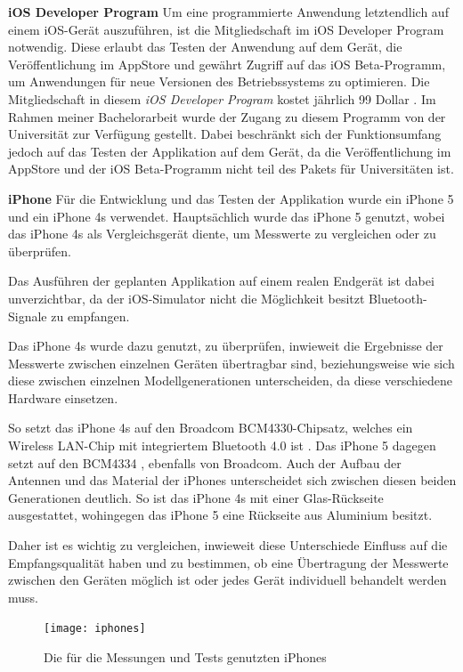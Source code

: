 \textbf{iOS Developer Program}
Um eine programmierte Anwendung letztendlich auf einem iOS-Gerät auszuführen, ist die Mitgliedschaft im iOS Developer Program notwendig.
Diese erlaubt das Testen der Anwendung auf dem Gerät, die Veröffentlichung im AppStore und gewährt Zugriff auf das iOS Beta-Programm, um Anwendungen für neue Versionen des Betriebssystems zu optimieren.
Die Mitgliedschaft in diesem \emph{iOS Developer Program} kostet jährlich 99 Dollar \cite{iosdevprog}. 
Im Rahmen meiner Bachelorarbeit wurde der Zugang zu diesem Programm von der Universität zur Verfügung gestellt. Dabei beschränkt sich der Funktionsumfang jedoch auf das Testen der Applikation auf dem Gerät, da die Veröffentlichung im AppStore und der iOS Beta-Programm nicht teil des Pakets für Universitäten ist.

\textbf{iPhone}
Für die Entwicklung und das Testen der Applikation wurde ein iPhone 5 und ein iPhone 4s verwendet. 
Hauptsächlich wurde das iPhone 5 genutzt, wobei das iPhone 4s als Vergleichsgerät diente, um Messwerte zu vergleichen oder zu überprüfen.

Das Ausführen der geplanten Applikation auf einem realen Endgerät ist dabei unverzichtbar, da der iOS-Simulator nicht die Möglichkeit besitzt Bluetooth-Signale zu empfangen.

Das iPhone 4s wurde dazu genutzt, zu überprüfen, inwieweit die Ergebnisse der Messwerte zwischen einzelnen Geräten übertragbar sind, beziehungsweise wie sich diese zwischen einzelnen Modellgenerationen unterscheiden, da diese verschiedene Hardware einsetzen. 

So setzt das iPhone 4s auf den Broadcom BCM4330-Chipsatz, welches ein Wireless LAN-Chip mit integriertem Bluetooth 4.0 ist \cite{iPhone4sTeardown}. Das iPhone 5 dagegen setzt auf den BCM4334 \cite{iPhone5Teardown}, ebenfalls von Broadcom. 
Auch der Aufbau der Antennen und das Material der iPhones unterscheidet sich zwischen diesen beiden Generationen deutlich. 
So ist das iPhone 4s mit einer Glas-Rückseite ausgestattet, wohingegen das iPhone 5 eine Rückseite aus Aluminium besitzt.

Daher ist es wichtig zu vergleichen, inwieweit diese Unterschiede Einfluss auf die Empfangsqualität haben und zu bestimmen, ob eine Übertragung der Messwerte zwischen den Geräten möglich ist oder jedes Gerät individuell behandelt werden muss.

\begin{figure}[htb!]
		\centering
	\texttt{[image: iphones]}
	\caption{Die für die Messungen und Tests genutzten iPhones}
	\label{iphones}
\end{figure}

